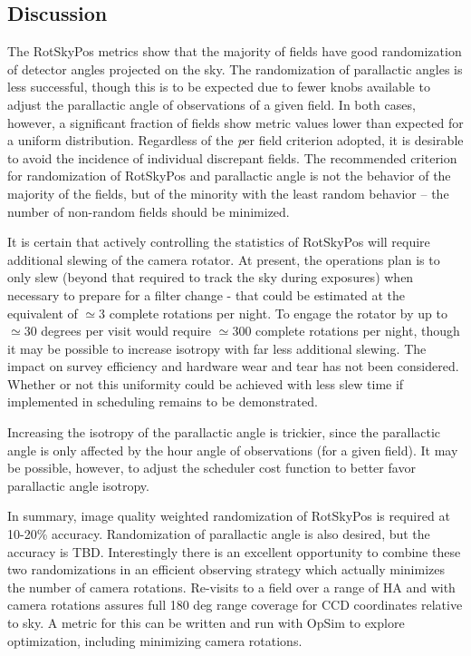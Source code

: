 \subsection{Discussion}

The RotSkyPos metrics show that the majority of fields have good randomization
of detector angles projected on the sky.  The randomization of parallactic
angles is less successful, though this is to be expected due to fewer knobs
available to adjust the parallactic angle of observations of a given field.  In
both cases, however, a significant fraction of fields show metric values lower
than expected for a uniform distribution.  Regardless of the {\emph per field}
criterion adopted, it is desirable to avoid the incidence of individual
discrepant fields.  The recommended criterion for randomization of RotSkyPos and
parallactic angle is not the behavior of the majority of the fields, but of the
minority with the least random behavior -- the number of non-random fields
should be minimized.

It is certain that actively controlling the statistics of RotSkyPos will require
additional slewing of the camera rotator.  At present, the operations plan is to
only slew (beyond that required to track the sky during exposures) when
necessary to prepare for a filter change - that could be estimated at the
equivalent of $\simeq 3$ complete rotations per night.  To engage the rotator by
up to $\simeq 30$ degrees per visit would require $\simeq 300$ complete
rotations per night, though it may be possible to increase isotropy with far
less additional slewing.  The impact on survey efficiency and hardware wear and
tear has not been considered.  Whether or not this uniformity could be achieved
with less slew time if implemented in scheduling remains to be demonstrated.

Increasing the isotropy of the parallactic angle is trickier, since the
parallactic angle is only affected by the hour angle of observations (for a
given field).  It may be possible, however, to adjust the scheduler cost
function to better favor parallactic angle isotropy.

In summary, image quality weighted randomization of RotSkyPos is required at
10-20\% accuracy.   Randomization of parallactic angle is also desired, but the
accuracy is TBD.  Interestingly there is an excellent  opportunity to combine
these two randomizations in an efficient observing strategy which actually
minimizes the number of camera rotations.   Re-visits to a field over a range of
HA and with camera rotations assures full 180 deg range coverage for CCD
coordinates relative to sky.  A metric for this can be written and run with
OpSim to explore optimization, including minimizing camera rotations.



